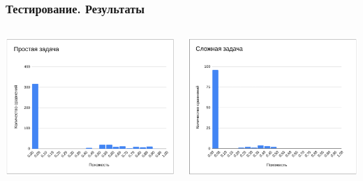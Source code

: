 \documentclass[10pt]{beamer}
\begin{document}
\begin{frame}\frametitle{Тестирование. Результаты}
	\begin{columns}
		\centering
		\includegraphics[scale=0.51]{res5.png}
		
		\centering
		\includegraphics[scale=0.51]{res6.png}
		
	\end{columns}
\end{frame}
\end{document}
